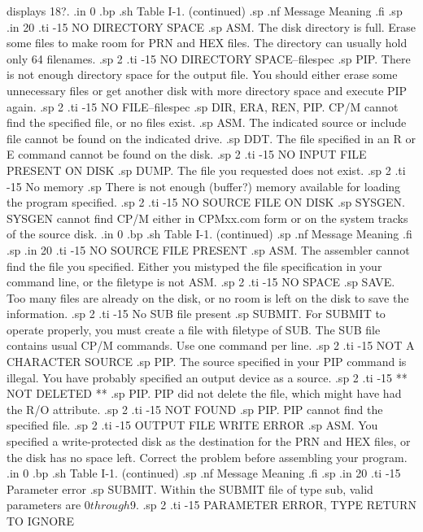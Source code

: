 displays 18?.
.in 0
.bp 
.sh
                     Table I-1.  (continued)
.sp
.nf
     Message        Meaning
.fi
.sp
.in 20
.ti -15
NO DIRECTORY SPACE
.sp
ASM.  The disk directory is full.  Erase some files to make room 
for PRN and HEX files.  The directory can usually hold only 64 
filenames.
.sp 2
.ti -15
NO DIRECTORY SPACE--{filespec}
.sp
PIP.  There is not enough directory space for the output file.  
You should either erase some unnecessary files or get another 
disk with more directory space and execute PIP again.
.sp 2
.ti -15
NO FILE--{filespec}
.sp
DIR, ERA, REN, PIP.  CP/M cannot find the specified file, or no 
files exist.
.sp
ASM.  The indicated source or include file cannot be found on the 
indicated drive.
.sp
DDT.  The file specified in an R or E command cannot be found on 
the disk.
.sp 2
.ti -15
NO INPUT FILE PRESENT ON DISK
.sp
DUMP.  The file you requested does not exist.
.sp 2
.ti -15
No memory
.sp
There is not enough (buffer?) memory available for loading the 
program specified.
.sp 2
.ti -15
NO SOURCE FILE ON DISK
.sp
SYSGEN.  SYSGEN cannot find CP/M either in CPMxx.com form or on 
the system tracks of the source disk.
.in 0
.bp
.sh
                     Table I-1.  (continued)
.sp
.nf
     Message        Meaning
.fi
.sp
.in 20
.ti -15
NO SOURCE FILE PRESENT
.sp 
ASM.  The assembler cannot find the file you specified.  Either 
you mistyped the file specification in your command line, or the 
filetype is not ASM.
.sp 2
.ti -15
NO SPACE
.sp
SAVE.  Too many files are already on the disk, or no room is left 
on the disk to save the information.
.sp 2
.ti -15
No SUB file present
.sp
SUBMIT.  For SUBMIT to operate properly, you must create a file 
with filetype of SUB.  The SUB file contains usual CP/M commands.  
Use one command per line.
.sp 2
.ti -15
NOT A CHARACTER SOURCE
.sp
PIP.  The source specified in your PIP command is illegal.  You 
have probably specified an output device as a source.
.sp 2
.ti -15
** NOT DELETED **
.sp
PIP.  PIP did not delete the file, which might have had the R/O 
attribute.
.sp 2
.ti -15
NOT FOUND
.sp
PIP.  PIP cannot find the specified file.
.sp 2
.ti -15
OUTPUT FILE WRITE ERROR
.sp 
ASM.  You specified a write-protected disk as the destination for 
the PRN and HEX files, or the disk has no space left.  Correct 
the problem before assembling your program.
.in 0
.bp
.sh
                     Table I-1.  (continued)
.sp
.nf
     Message        Meaning
.fi
.sp
.in 20
.ti -15
Parameter error
.sp
SUBMIT.  Within the SUBMIT file of type sub, valid parameters are 
$0 through $9.
.sp 2
.ti -15
PARAMETER ERROR, TYPE RETURN TO IGNORE
